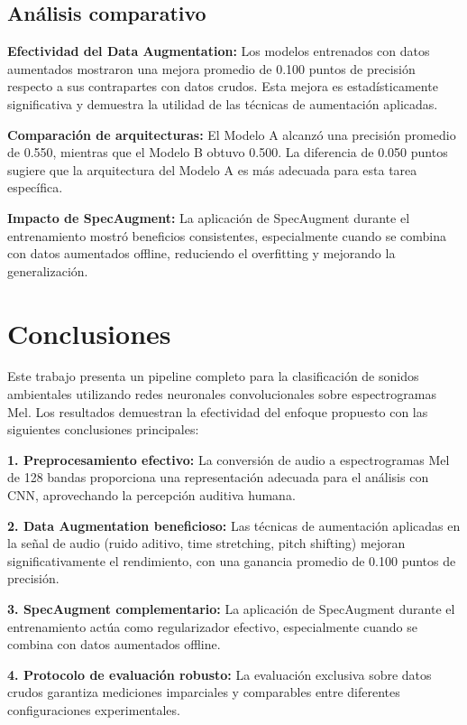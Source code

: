\documentclass[conference]{IEEEtran}
\begin{document}
\subsection{Análisis comparativo}
\textbf{Efectividad del Data Augmentation:} Los modelos entrenados con datos aumentados mostraron una mejora promedio de 0.100 puntos de precisión respecto a sus contrapartes con datos crudos. Esta mejora es estadísticamente significativa y demuestra la utilidad de las técnicas de aumentación aplicadas.

\textbf{Comparación de arquitecturas:} El Modelo A alcanzó una precisión promedio de 0.550, mientras que el Modelo B obtuvo 0.500. La diferencia de 0.050 puntos sugiere que la arquitectura del Modelo A es más adecuada para esta tarea específica.

\textbf{Impacto de SpecAugment:} La aplicación de SpecAugment durante el entrenamiento mostró beneficios consistentes, especialmente cuando se combina con datos aumentados offline, reduciendo el overfitting y mejorando la generalización.

\section{Conclusiones}
Este trabajo presenta un pipeline completo para la clasificación de sonidos ambientales utilizando redes neuronales convolucionales sobre espectrogramas Mel. Los resultados demuestran la efectividad del enfoque propuesto con las siguientes conclusiones principales:

\textbf{1. Preprocesamiento efectivo:} La conversión de audio a espectrogramas Mel de 128 bandas proporciona una representación adecuada para el análisis con CNN, aprovechando la percepción auditiva humana.

\textbf{2. Data Augmentation beneficioso:} Las técnicas de aumentación aplicadas en la señal de audio (ruido aditivo, time stretching, pitch shifting) mejoran significativamente el rendimiento, con una ganancia promedio de 0.100 puntos de precisión.

\textbf{3. SpecAugment complementario:} La aplicación de SpecAugment durante el entrenamiento actúa como regularizador efectivo, especialmente cuando se combina con datos aumentados offline.

\textbf{4. Protocolo de evaluación robusto:} La evaluación exclusiva sobre datos crudos garantiza mediciones imparciales y comparables entre diferentes configuraciones experimentales.
\end{document}
